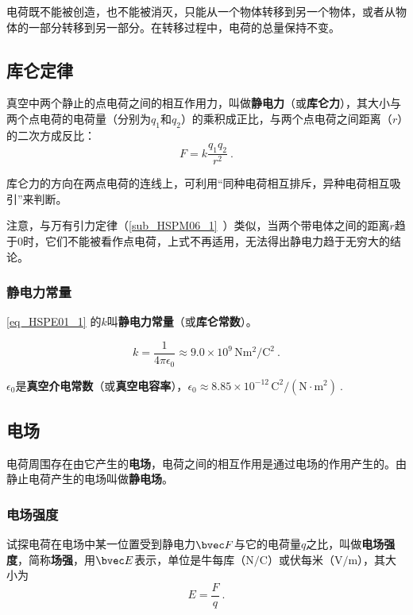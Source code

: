 电荷既不能被创造，也不能被消灭，只能从一个物体转移到另一个物体，或者从物体的一部分转移到另一部分。在转移过程中，电荷的总量保持不变。

\subsection{库仑定律}

真空中两个静止的点电荷之间的相互作用力，叫做\textbf{静电力}（或\textbf{库仑力}），其大小与两个点电荷的电荷量（分别为$q_1$和$q_2$）的乘积成正比，与两个点电荷之间距离（$r$）的二次方成反比：
\begin{equation}\label{eq_HSPE01_1}
F=k \frac{q_1 q_2}{r^2}~.
\end{equation}

库仑力的方向在两点电荷的连线上，可利用“同种电荷相互排斥，异种电荷相互吸引”来判断。

注意，与万有引力定律（\autoref{sub_HSPM06_1}~）类似，当两个带电体之间的距离$r$趋于$0$时，它们不能被看作点电荷，上式不再适用，无法得出静电力趋于无穷大的结论。

\subsubsection{静电力常量}

\autoref{eq_HSPE01_1} 的$k$叫\textbf{静电力常量}（或\textbf{库仑常数}）。

\begin{equation}\label{eq_HSPE01_8}
k = \frac{1}{4\pi\epsilon_0} \approx 9.0 \times 10^{9} \,\mathrm{N m^2/C^2}~.
\end{equation}

$\epsilon_0$是\textbf{真空介电常数}（或\textbf{真空电容率}），$\epsilon_0 \approx 8.85 \times 10^{-12}  \,\mathrm{C^2/(N \cdot m^2)}~.
$

\subsection{电场}

电荷周围存在由它产生的\textbf{电场}，电荷之间的相互作用是通过电场的作用产生的。由静止电荷产生的电场叫做\textbf{静电场}。

\subsubsection{电场强度}

试探电荷在电场中某一位置受到静电力$\bvec F$与它的电荷量$q$之比，叫做\textbf{电场强度}，简称\textbf{场强}，用$\bvec E$表示，单位是牛每库（$\mathrm{N/C}$）或伏每米（$\mathrm{V/m}$），其大小为
\begin{equation}\label{eq_HSPE01_2}
E =\frac {F}{q}~.
\end{equation}

